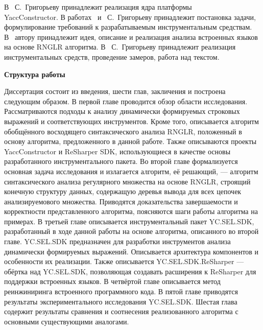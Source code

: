 В~\cite{YCArticle} С.~Григорьеву принадлежит реализация ядра платформы \\ YaccConstructor. В работах~\cite{SELforIDEru,AbstractGLL} и~\cite{SELforIDE} С.~Григорьеву принадлежит постановка задачи, формулирование требований к разрабатываемым инструментальным средствам. В~\cite{Grigorev6} автору принадлежит идея, описание и реализация анализа встроенных языков на основе RNGLR алгоритма. В~\cite{Syrcose} С.~Григорьеву принадлежит реализация инструментальных средств, проведение замеров, работа над текстом.


\textbf{Структура работы}

Диссертация состоит из введения, шести глав, закличения и построена следующим образом. В первой главе проводится обзор области исследования. Рассматриваются подходы к анализу динамически формируемых строковых 
выражений и соответствующих инструментов. Кроме того, описывается алгоритм обобщённого восходящего синтаксического анализа RNGLR, положенный в основу алгоритма, предложенного в данной работе. Также описываются 
проекты YaccConstructor и ReSharper SDK, использующиеся в качестве основы разработанного инструментального пакета. Во второй главе формализуется основная задача исследования и излагается алгоритм, 
её решающий, --- алгоритм синтаксического анализа регулярного множества на основе RNGLR, строящий конечную структуру данных, содержащую деревья вывода для всех цепочек анализируемового множества. 
Приводятся доказательства завершаемости и корректности представленного алгоритма, поясняются шаги работы алгоритма на примерах. В третьей главе описывается инструментальный пакет YC.SEL.SDK, 
разработанный в ходе данной работы на основе алгоритма, описанного во второй главе. YC.SEL.SDK предназначен для разработки инструментов анализа динамически формируемых выражений. Описывается архитектура 
компонентов и особенности их реализации. Также описывается YC.SEL.SDK.ReSharper --- обёртка над YC.SEL.SDK, позволяющая создавать расширения к ReSharper для поддержки встроенных языков. В четвёртой главе 
описывается метод реинжиниринга встроенного программного кода.  В пятой главе приводятся результаты экспериментального исследования YC.SEL.SDK. Шестая глава содержит результаты сравнения и соотнесения реализованного алгоритма с основными существующими аналогами.


\clearpage
